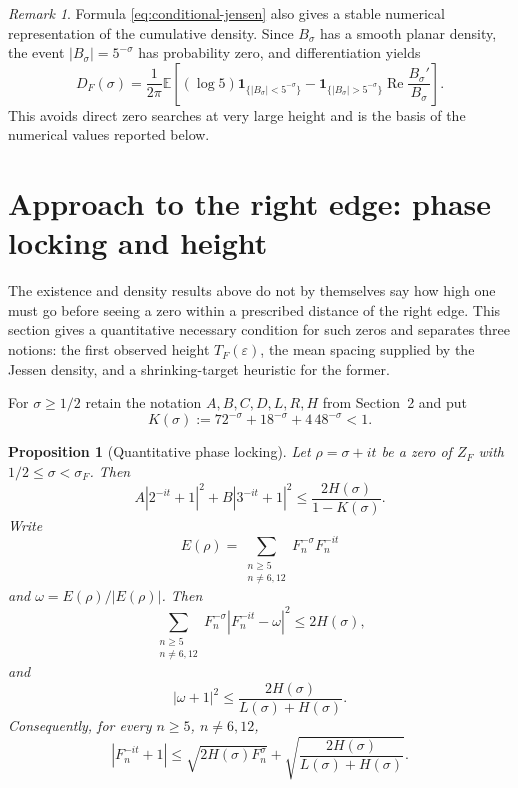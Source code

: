 \documentclass[11pt]{article}
\newtheorem{proposition}[theorem]{Proposition}
\theoremstyle{remark}
\newtheorem{remark}[theorem]{Remark}
\newcommand{\ZF}{Z_F}
\newcommand{\Ree}{\operatorname{Re}}
\begin{document}
\begin{remark}\label{rem:conditional-derivative}
Formula \eqref{eq:conditional-jensen} also gives a stable numerical representation of the cumulative density.  Since $B_\sigma$ has a smooth planar density, the event $|B_\sigma|=5^{-\sigma}$ has probability zero, and differentiation yields
\[
D_F(\sigma)=\frac1{2\pi}\mathbb E\!\left[
(\log5)\mathbf 1_{\{|B_\sigma|<5^{-\sigma}\}}
-\mathbf 1_{\{|B_\sigma|>5^{-\sigma}\}}
\Ree\frac{B_\sigma'}{B_\sigma}
\right].
\]
This avoids direct zero searches at very large height and is the basis of the numerical values reported below.

\end{remark}

\section{Approach to the right edge: phase locking and height}\label{sec:height}

The existence and density results above do not by themselves say how high one must go before seeing a zero within a prescribed distance of the right edge.  This section gives a quantitative necessary condition for such zeros and separates three notions: the first observed height $T_F(\varepsilon)$, the mean spacing supplied by the Jessen density, and a shrinking-target heuristic for the former.

For $\sigma\ge1/2$ retain the notation $A,B,C,D,L,R,H$ from Section~2 and put
\[
K(\sigma):=72^{-\sigma}+18^{-\sigma}+4\,48^{-\sigma}<1.
\]

\begin{proposition}[Quantitative phase locking]\label{prop:phase-lock}
Let $\rho=\sigma+it$ be a zero of $\ZF$ with $1/2\le\sigma<\sigma_F$.  Then
\begin{equation}\label{eq:lock23}
A|2^{-it}+1|^2+B|3^{-it}+1|^2
\le \frac{2H(\sigma)}{1-K(\sigma)}.
\end{equation}
Write
\[
E(\rho)=\sum_{\substack{n\ge5\\n\ne6,12}}F_n^{-\sigma}F_n^{-it}
\]
and $\omega=E(\rho)/|E(\rho)|$.  Then
\begin{equation}\label{eq:lock-free-energy}
\sum_{\substack{n\ge5\\n\ne6,12}}
F_n^{-\sigma}|F_n^{-it}-\omega|^2\le2H(\sigma),
\end{equation}
and
\begin{equation}\label{eq:lock-direction}
|\omega+1|^2\le\frac{2H(\sigma)}{L(\sigma)+H(\sigma)}.
\end{equation}
Consequently, for every $n\ge5$, $n\ne6,12$,
\begin{equation}\label{eq:lock-individual}
|F_n^{-it}+1|
\le \sqrt{2H(\sigma)F_n^{\sigma}}
+\sqrt{\frac{2H(\sigma)}{L(\sigma)+H(\sigma)}}.
\end{equation}
\end{proposition}
\end{document}
